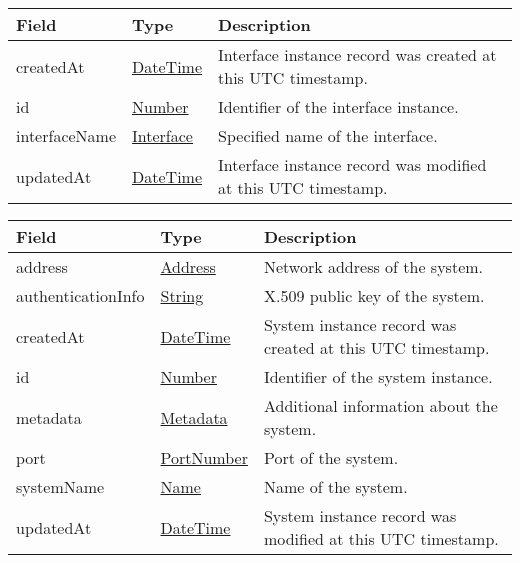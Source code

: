 \documentclass[a4paper]{arrowhead}
\newcommand{\pref}[1]{{\textcolor{ArrowheadGrey}{\hyperref[sec:model:primitives:#1]{#1}}}}
\begin{document}
\label{sec:model:InterfaceRecord}

\begin{table}[ht!]
\begin{tabularx}{\textwidth}{| p{4.25cm} | p{2cm} | X |} \hline
\rowcolor{gray!33} Field & Type      & Description \\ \hline
createdAt & \pref{DateTime} & Interface instance record was created at this UTC timestamp. \\ \hline
id & \pref{Number} & Identifier of the interface instance. \\ \hline
interfaceName & \pref{Interface}  & Specified name of the interface. \\ \hline
updatedAt & \pref{DateTime} & Interface instance record was modified at this UTC timestamp. \\ \hline
\end{tabularx}
\end{table}

\clearpage

\label{sec:model:SystemRecord}

\begin{table}[ht!]
\begin{tabularx}{\textwidth}{| p{4.25cm} | p{3.5cm} | X |} \hline
\rowcolor{gray!33} Field & Type & Description \\ \hline

address &\pref{Address} & Network address of the system. \\ \hline
authenticationInfo &\pref{String} & X.509 public key of the system. \\ \hline
createdAt & \pref{DateTime} & System instance record was created at this UTC time\-stamp. \\ \hline
id & \pref{Number} & Identifier of the system instance. \\ \hline
metadata &\hyperref[sec:model:Metadata]{Metadata} & Additional information about the system. \\ \hline
port &\pref{PortNumber} & Port of the system. \\ \hline
systemName &\pref{Name} & Name of the system. \\ \hline
updatedAt & \pref{DateTime} & System instance record was modified at this UTC time\-stamp. \\ \hline
\end{tabularx}
\end{table}

\label{sec:model:ServiceDefinitionRecord}
\end{document}
